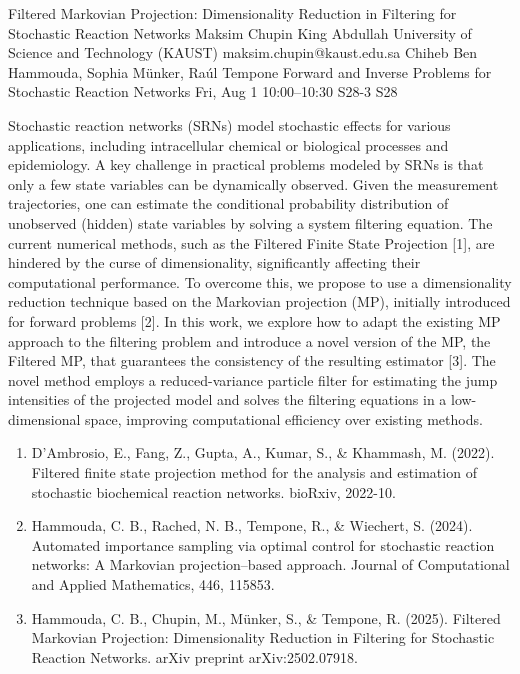 \begin{talk}
  {Filtered Markovian Projection: Dimensionality Reduction in Filtering for Stochastic Reaction Networks}%
  {Maksim Chupin}%
  {King Abdullah University of Science and Technology (KAUST)}%
  {maksim.chupin@kaust.edu.sa}%
  {Chiheb Ben Hammouda, Sophia M\"{u}nker, Ra\'{u}l Tempone}%
  {Forward and Inverse Problems for Stochastic Reaction Networks}%
  {Fri, Aug 1 10:00--10:30}%
  {S28-3}%
  {S28}%
    
   
Stochastic reaction networks (SRNs) model stochastic effects for various applications, including intracellular chemical or biological processes and epidemiology. A key challenge in practical problems modeled by SRNs is that only a few state variables can be dynamically observed. Given the measurement trajectories, one can estimate the conditional probability distribution of unobserved (hidden) state variables by solving a system filtering equation. The current numerical methods, such as the Filtered Finite State Projection [1], are hindered by the curse of dimensionality, significantly affecting their computational performance. To overcome this, we propose to use a dimensionality reduction technique based on the Markovian projection (MP), initially introduced for forward problems [2]. In this work, we explore how to adapt the existing MP approach to the filtering problem and introduce a novel version of the MP, the Filtered MP, that guarantees the consistency of the resulting estimator [3]. The novel method employs a reduced-variance particle filter for estimating the jump intensities of the projected model and solves the filtering equations in a low-dimensional space, improving computational efficiency over existing methods.





\medskip

\begin{enumerate}
 \item[{[1]}] D’Ambrosio, E., Fang, Z., Gupta, A., Kumar, S., \& Khammash, M. (2022). Filtered finite state projection method for the analysis and estimation of stochastic biochemical reaction networks. bioRxiv, 2022-10.
 \item[{[2]}] Hammouda, C. B., Rached, N. B., Tempone, R., \& Wiechert, S. (2024). Automated importance sampling via optimal control for stochastic reaction networks: A Markovian projection--based approach. Journal of Computational and Applied Mathematics, 446, 115853.
    \item [{[3]}] Hammouda, C. B., Chupin, M., M\"unker, S., \& Tempone, R. (2025). Filtered Markovian Projection: Dimensionality Reduction in Filtering for Stochastic Reaction Networks. arXiv preprint arXiv:2502.07918.
\end{enumerate}


\end{talk}


